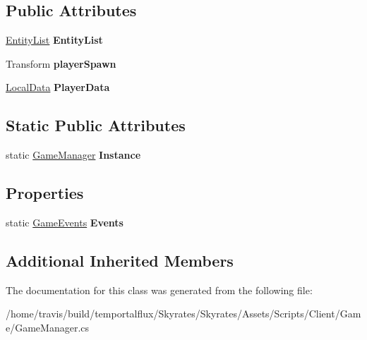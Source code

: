 \subsection*{Public Attributes}
\begin{DoxyCompactItemize}
\item 
\hypertarget{class_skyrates_1_1_client_1_1_game_1_1_game_manager_a6cd625a0d48f736b04afc3ec98e4ed53}{\hyperlink{class_skyrates_1_1_common_1_1_entity_1_1_entity_list}{Entity\-List} {\bfseries Entity\-List}}\label{class_skyrates_1_1_client_1_1_game_1_1_game_manager_a6cd625a0d48f736b04afc3ec98e4ed53}

\item 
\hypertarget{class_skyrates_1_1_client_1_1_game_1_1_game_manager_a39846b49f8069b0d99ce5622aac06ac8}{Transform {\bfseries player\-Spawn}}\label{class_skyrates_1_1_client_1_1_game_1_1_game_manager_a39846b49f8069b0d99ce5622aac06ac8}

\item 
\hypertarget{class_skyrates_1_1_client_1_1_game_1_1_game_manager_a370a843db6f1bc3d9a3e9a500aad0775}{\hyperlink{class_local_data}{Local\-Data} {\bfseries Player\-Data}}\label{class_skyrates_1_1_client_1_1_game_1_1_game_manager_a370a843db6f1bc3d9a3e9a500aad0775}

\end{DoxyCompactItemize}
\subsection*{Static Public Attributes}
\begin{DoxyCompactItemize}
\item 
\hypertarget{class_skyrates_1_1_client_1_1_game_1_1_game_manager_accacf771756ee6a41d2c0ced6bf798ca}{static \hyperlink{class_skyrates_1_1_client_1_1_game_1_1_game_manager}{Game\-Manager} {\bfseries Instance}}\label{class_skyrates_1_1_client_1_1_game_1_1_game_manager_accacf771756ee6a41d2c0ced6bf798ca}

\end{DoxyCompactItemize}
\subsection*{Properties}
\begin{DoxyCompactItemize}
\item 
\hypertarget{class_skyrates_1_1_client_1_1_game_1_1_game_manager_a0fe4743cbadedfc0ad93d51534f3d339}{static \hyperlink{class_skyrates_1_1_client_1_1_game_1_1_event_1_1_game_events}{Game\-Events} {\bfseries Events}}\label{class_skyrates_1_1_client_1_1_game_1_1_game_manager_a0fe4743cbadedfc0ad93d51534f3d339}

\end{DoxyCompactItemize}
\subsection*{Additional Inherited Members}


The documentation for this class was generated from the following file\-:\begin{DoxyCompactItemize}
\item 
/home/travis/build/temportalflux/\-Skyrates/\-Skyrates/\-Assets/\-Scripts/\-Client/\-Game/Game\-Manager.\-cs\end{DoxyCompactItemize}
